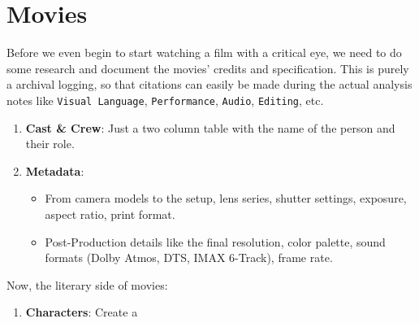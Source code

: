 \part{Movies}
Before we even begin to start watching a film with a critical eye, we need to do some research and document the movies' credits and specification. This is purely a archival logging, so that citations can easily be made during the actual analysis notes like \texttt{Visual Language}, \texttt{Performance}, \texttt{Audio}, \texttt{Editing}, etc.

\begin{enumerate}
	\item \textbf{Cast \& Crew}: Just a two column table with the name of the person and their role.
	
	\item \textbf{Metadata}:
	\begin{itemize}
		\item From camera models to the setup, lens series, shutter settings, exposure, aspect ratio, print format.
		
		\item Post-Production details like the final resolution, color palette, sound formats (Dolby Atmos, DTS, IMAX 6-Track), frame rate.
	\end{itemize}
\end{enumerate}

Now, the literary side of movies:

\begin{enumerate}
	\item \textbf{Characters}: Create a 
\end{enumerate}